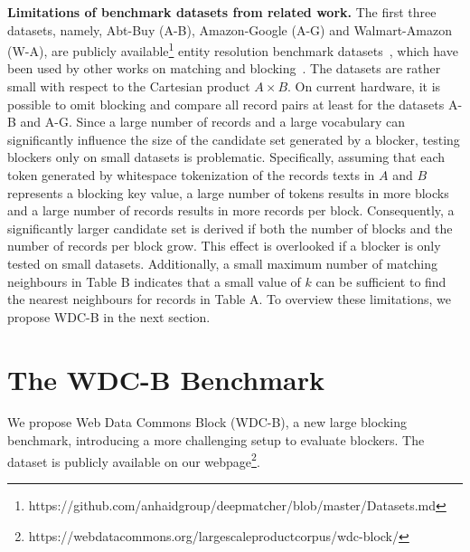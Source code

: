 \documentclass[sigconf,nonacm]{acmart}
\begin{document}
\vspace{.1cm}\noindent\textbf{Limitations of benchmark datasets from related work.}
The first three datasets, namely, Abt-Buy (A-B), Amazon-Google (A-G) and Walmart-Amazon (W-A), are publicly available\footnote{https://github.com/anhaidgroup/deepmatcher/blob/master/Datasets.md} entity resolution benchmark datasets~\cite{konda_magellan_2016}, which have been used by other works on matching and blocking~\cite{thirumuruganathan_deep_2021, mudgal_deep_2018, li_deep_2020, peeters_dual-objective_2021, peeters_supervised_2022}.
The datasets are rather small with respect to the Cartesian product $A\times B$. On current hardware, it is possible to omit blocking and compare all record pairs at least for the datasets A-B and A-G. Since a large number of records and a large vocabulary can significantly influence the size of the candidate set generated by a blocker, testing blockers only on small datasets is problematic. Specifically, assuming that each token generated by whitespace tokenization of the records texts in $A$ and $B$ represents a blocking key value, a large number of tokens results in more blocks and a large number of records results in more records per block.
Consequently, a significantly larger candidate set is derived if both the number of blocks and the number of records per block grow. This effect is overlooked if a blocker is only tested on small datasets.
Additionally, a small maximum number of matching neighbours in Table B indicates that a small value of $k$ can be sufficient to find the nearest neighbours for records in Table A.
To overview these limitations, we propose WDC-B in the next section.


\section{The WDC-B Benchmark}
\label{sec:wdc_b}
We propose Web Data Commons Block (WDC-B), a new large blocking benchmark, introducing a more challenging setup to evaluate blockers. 
The dataset is publicly available on our webpage\footnote{https://webdatacommons.org/largescaleproductcorpus/wdc-block/}.
\end{document}
